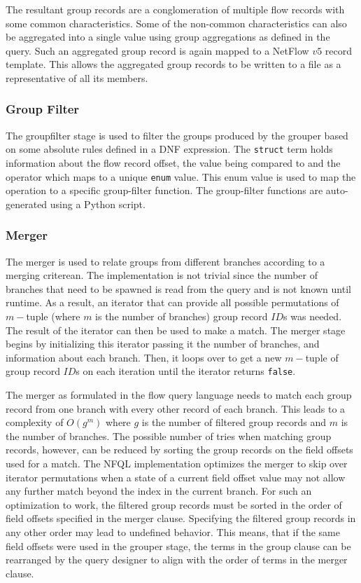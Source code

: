 The resultant group records are a conglomeration of multiple flow records with
some common characteristics. Some of the non-common characteristics can also
be aggregated into a single value using group aggregations as defined in the
query. Such an aggregated group record is again mapped to a NetFlow $v5$
record template. This allows the aggregated group records to be written to a
file as a representative of all its members.

\subsubsection{Group Filter} The groupfilter stage is used to filter the
groups produced by the grouper based on some absolute rules defined in a
\ac{DNF} expression. The \texttt{struct} term holds information about the flow
record offset, the value being compared to and the operator which maps to a
unique \texttt{enum} value.  This enum value is used to map the operation to a
specific group-filter function. The group-filter functions are auto-generated
using a Python script.

\subsubsection{Merger}

The merger is used to relate groups from different branches according to a
merging criterean. The implementation is not trivial since the number of
branches that need to be spawned is read from the query and is not known until
runtime. As a result, an iterator that can provide all possible permutations
of $m-$tuple (where $m$ is the number of branches) group record $ID$s was
needed.  The result of the iterator can then be used to make a match. The
merger stage begins by initializing this iterator passing it the number of
branches, and information about each branch. Then, it loops over to get a new
$m-$tuple of group record $ID$s on each iteration until the iterator returns
\texttt{false}.

The merger as formulated in the flow query language needs to match each group
record from one branch with every other record of each branch. This leads to a
complexity of $O(g^m)$ where $g$ is the number of filtered group records and
$m$ is the number of branches. The possible number of tries when matching
group records, however, can be reduced by sorting the group records on the
field offsets used for a match. The \ac{NFQL} implementation optimizes the
merger to skip over iterator permutations when a state of a current field
offset value may not allow any further match beyond the index in the current
branch.  For such an optimization to work, the filtered group records must be
sorted in the order of field offsets specified in the merger clause.
Specifying the filtered group records in any other order may lead to undefined
behavior. This means, that if the same field offsets were used in the grouper
stage, the terms in the group clause can be rearranged by the query designer
to align with the order of terms in the merger clause.

